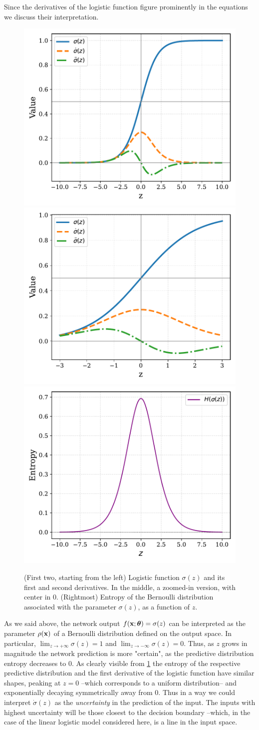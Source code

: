 \documentclass{article} %
\begin{document}
Since the derivatives of the logistic function figure prominently in the equations we discuss their interpretation. 
\begin{figure}[h!]
    \centering
    \includegraphics[width=0.3\linewidth]{figures/logistic_wide_range.pdf}
    \includegraphics[width=0.3\linewidth]{figures/logistic_zoomed.pdf}
    \includegraphics[width=0.3\linewidth]{figures/logistic_entropy.pdf}
    \caption{(First two, starting from the left) Logistic function $\sigma(z)$ and its first and second derivatives. In the middle, a zoomed-in version, with center in $0$. (Rightmost) Entropy of the Bernoulli distribution associated with the parameter $\sigma(z)$, as a function of $z$.}
    \label{fig:logistic-function}
\end{figure}
As we said above, the network output $f(\mbox{$\mbox{$\mathbf{x}$}$};\mbox{$\mbox{$\boldsymbol{\theta}$}$}) = \sigma(z)$ can be interpreted as the parameter $\rho(\mbox{$\mbox{$\mathbf{x}$}$})$ of a Bernoulli distribution defined on the output space. In particular, $\lim_{z \to + \infty} \sigma(z) = 1$ and $\lim_{z \to - \infty} \sigma(z) = 0$. Thus, as $z$ grows in magnitude the network prediction is more "certain", as the predictive distribution entropy decreases to $0$. As clearly visible from \cref{fig:logistic-function} the entropy of the respective predictive distribution and the first derivative of the logistic function have similar shapes, peaking at $z=0$ --which corresponds to a uniform distribution-- and exponentially decaying symmetrically away from $0$. Thus in a way we could interpret $\dot \sigma(z)$ as the \emph{uncertainty} in the prediction of the input. The inputs with highest uncertainty will be those closest to the decision boundary --which, in the case of the linear logistic model considered here, is a line in the input space. 
\end{document}
